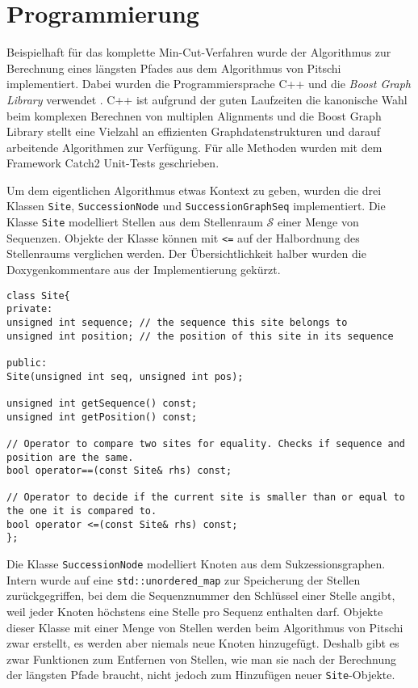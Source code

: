 \chapter{Programmierung}
\label{ch:Programmierung}

Beispielhaft für das komplette Min-Cut-Verfahren wurde der Algorithmus zur Berechnung eines längsten Pfades aus dem Algorithmus von Pitschi implementiert. Dabei wurden die Programmiersprache C++ und die \emph{Boost Graph Library} verwendet \cite{boost_graph}. C++ ist aufgrund der guten Laufzeiten die kanonische Wahl beim komplexen Berechnen von multiplen Alignments und die Boost Graph Library stellt eine Vielzahl an effizienten Graphdatenstrukturen und darauf arbeitende Algorithmen zur Verfügung. Für alle Methoden wurden mit dem Framework Catch2 Unit-Tests geschrieben\cite{Catch}.

Um dem eigentlichen Algorithmus etwas Kontext zu geben, wurden die drei Klassen \texttt{Site}, \texttt{SuccessionNode} und \texttt{SuccessionGraphSeq} implementiert. Die Klasse \texttt{Site} modelliert Stellen aus dem Stellenraum $\mathcal{S}$ einer Menge von Sequenzen. Objekte der Klasse können mit \texttt{<=} auf der Halbordnung des Stellenraums verglichen werden. Der Übersichtlichkeit halber wurden die Doxygenkommentare aus der Implementierung gekürzt.

\begin{verbatim}
class Site{
private:
unsigned int sequence; // the sequence this site belongs to
unsigned int position; // the position of this site in its sequence

public:
Site(unsigned int seq, unsigned int pos);

unsigned int getSequence() const;
unsigned int getPosition() const;

// Operator to compare two sites for equality. Checks if sequence and position are the same.
bool operator==(const Site& rhs) const;

// Operator to decide if the current site is smaller than or equal to the one it is compared to.
bool operator <=(const Site& rhs) const;
};
\end{verbatim}

Die Klasse \texttt{SuccessionNode} modelliert Knoten aus dem Sukzessionsgraphen. Intern wurde auf eine \texttt{std::unordered_map} zur Speicherung der Stellen zurückgegriffen, bei dem die Sequenznummer den Schlüssel einer Stelle angibt, weil jeder Knoten höchstens eine Stelle pro Sequenz enthalten darf. Objekte dieser Klasse mit einer Menge von Stellen werden beim Algorithmus von Pitschi zwar erstellt, es werden aber niemals neue Knoten hinzugefügt. Deshalb gibt es zwar Funktionen zum Entfernen von Stellen, wie man sie nach der Berechnung der längsten Pfade braucht, nicht jedoch zum Hinzufügen neuer \texttt{Site}-Objekte.

